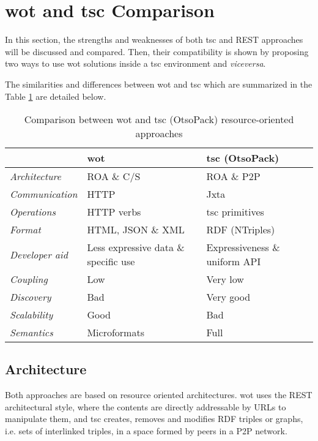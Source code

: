 \section{\acs{wot} and \acs{tsc} Comparison}
\label{sec:wot_tsc_comparison}


In this section, the strengths and weaknesses of both \ac{tsc} and REST approaches will be discussed and compared.
Then, their compatibility is shown by proposing two ways to use \ac{wot} solutions inside a \ac{tsc} environment and \textit{viceversa}.

The similarities and differences between \ac{wot} and \ac{tsc} which are summarized in the Table \ref{tab:comparison} are detailed below.

\begin{table}[ht!]
\centering
\caption {Comparison between \ac{wot} and \ac{tsc} (OtsoPack) resource-oriented approaches}
\begin{tabular}{|l|p{}|p{}|}
\hline
& \ac{wot} & \ac{tsc} (OtsoPack) \\
\hline
\textit{Architecture} & ROA \& C/S & ROA \& P2P \\
\textit{Communication} & HTTP & Jxta \\
\textit{Operations} & HTTP verbs & \ac{tsc} primitives \\
\textit{Format} & HTML, JSON \& XML & RDF (NTriples) \\ %
\textit{Developer aid} & Less expressive data \& specific use & Expressiveness \& uniform API \\
\textit{Coupling} & Low & Very low \\ %
\textit{Discovery} & Bad & Very good \\
\textit{Scalability} & Good & Bad \\
\textit{Semantics} & Microformats & Full \\
\hline
\end{tabular}
\label{tab:comparison}
\end{table}

\subsection{Architecture}
Both approaches are based on resource oriented architectures. \ac{wot} uses the REST architectural style, where the contents are directly addressable by
URLs to manipulate them, and \ac{tsc} creates, removes and modifies RDF triples or graphs, i.e. sets of interlinked triples, in a space formed by peers
in a P2P network.

